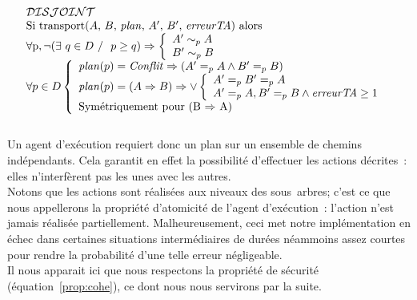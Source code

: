 \documentclass[11pt]{report}
\newcommand{\Conflit}{\ensuremath{\mathit{Conflit}}}
\newcommand{\disjoint}{\ensuremath{\mathcal{DISJOINT}}}
\begin{document}
{\[\begin{array}{l}
\disjoint\ \\
\mbox{Si transport($A$, $B$, $\mathit{plan}$, $A'$, $B'$, 
$\mathit{erreurTA}$) alors}\\ 
\forall $p$, \neg (\exists \mbox{\ $q \in D$ / \ } p \geq q) \Rightarrow
\left\{
\begin{array}{l}
 A' \sim_{p} A\\
 B' \sim_{p} B  
\end{array} \right.\\
\forall p \in D \left\{
 \begin{array}{ll}
  \mathit{plan}(p) = \Conflit \Rightarrow (A' =_{p} A \wedge B' =_{p} B)\\
  \mathit{plan}(p) = (A \Rightarrow B) \Rightarrow \vee \left\{
   \begin{array}{ll}
    A' =_{p} B' =_{p} A\\
    A' =_{p} A, B' =_{p} B \wedge \mathit{erreurTA} \geq 1 
   \end{array} \right.\\
  \mbox{Sym\'etriquement pour (B $\Rightarrow$ A)}
 \end{array} \right.
\end{array}
\]\\
Un agent d'ex\'ecution requiert donc un plan sur un ensemble de chemins ind\'ependants.
Cela garantit en effet la possibilit\'e d'effectuer les actions d\'ecrites~: elles
n'interf\`erent pas les unes avec les autres. \\
Notons que les actions sont r\'ealis\'ees aux niveaux des sous~arbres; c'est ce que nous
appellerons la propri\'et\'e d'atomicit\'e de l'agent d'ex\'ecution~: l'action n'est jamais 
r\'ealis\'ee partiellement. Malheureusement, ceci met notre impl\'ementation en \'echec
dans certaines situations interm\'ediaires de dur\'ees n\'eammoins assez
courtes pour rendre la probabilit\'e d'une telle erreur n\'egligeable.\\
Il nous apparait ici que nous respectons la propri\'et\'e de s\'ecurit\'e
(\'equation~\ref{prop:cohe}), ce dont nous nous servirons par la suite.
}
\end{document}
